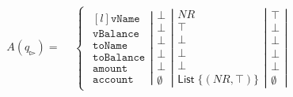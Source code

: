 \begin{align}
    \label{eq:example-fixed-point-1}
    A(q_{\whitepointerright})=
    \begin{split}
        &\left\{\begin{matrix}
                   \left.\begin{matrix*}[l]
                             \texttt{vName}\\
                             \texttt{vBalance}\\
                             \texttt{toName}\\
                             \texttt{toBalance}\\
                             \texttt{amount}\\
                             \texttt{account}
                   \end{matrix*}\right|
                   \left.\begin{matrix}
                             \bot\\
                             \bot\\
                             \bot\\
                             \bot\\
                             \bot\\
                             \emptyset
                   \end{matrix}\right|
                   \left.\begin{matrix}
                             NR\\
                             \top\\
                             \bot\\
                             \bot\\
                             \bot\\
                             \mathsf{List} \; \{(NR,\top)\}
                   \end{matrix}\right|
                   \left.\begin{matrix}
                             \top\\
                             \bot\\
                             \bot\\
                             \bot\\
                             \bot\\
                             \emptyset
                   \end{matrix}\right|

\end{matrix}
\end{split}
\end{align}
